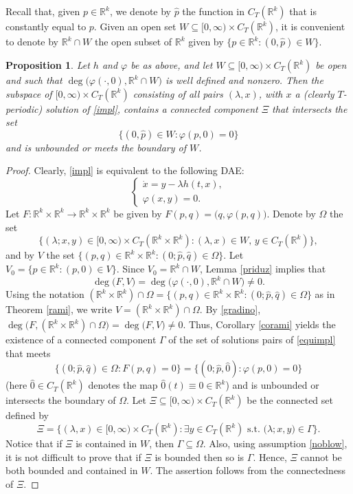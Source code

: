 \documentclass[a4paper]{amsart}
\numberwithin{equation}{section}
\newtheorem{proposition}[theorem]{Proposition}
\newcommand{\R}{\mathbb{R}}
\begin{document}
Recall that, given $p\in\R^k$, we denote by $\hat p$ the function in $C_T(\R^k)$ that is 
constantly equal to $p$. Given an open set $W\subseteq [0,\infty)\times C_T(\R^k)$, it is 
convenient to denote by $\R^k\cap W$ the open subset of $\R^k$ given by $\big\{ p\in\R^k: 
(0,\hat p)\in W\big\}$.


\begin{proposition}
Let $h$ and $\varphi$ be as above, and let $W\subseteq [0,\infty)\times C_T(\R^k)$ be 
open and such that  $\deg\big(\varphi(\cdot,0),\R^k\cap W\big)$ is well defined and nonzero. 
Then the subspace of $[0,\infty)\times C_T(\R^k)$ consisting of all pairs $(\lambda,x)$, 
with $x$ a (clearly $T$-periodic) solution of \eqref{impl}, contains a connected component 
$\Xi$ that intersects the set
\[
\big\{(0,\hat p)\in W:\varphi(p,0)=0\big\}
\]
and is unbounded or meets the boundary of $W$. 
\end{proposition}

\begin{proof}
Clearly, \eqref{impl} is equivalent to the following DAE:
\begin{equation}\label{equimpl}
\left\{
\begin{array}{l}
\dot x = y-\lambda h(t,x),\\
\varphi(x,y)=0.
\end{array}\right.
\end{equation}
Let $F:\R^k\times\R^k\to\R^k\times\R^k$ be given by $F(p,q)=\big(q,\varphi(p,q)\big)$.
Denote by $\Omega$ the set 
\[
\big\{(\lambda; x,y)\in[0,\infty)\times C_T(\R^k\times\R^k)
                                   :(\lambda,x)\in W,\,y\in C_T(\R^k)\big\},
\]
and by $V$ the set $\{(p,q)\in\R^k\times\R^k:(0;\hat p,\hat q)\in\Omega\}$. Let
$V_0=\{p\in\R^k:(p,0)\in V\}$. Since $V_0=\R^k\cap W$, Lemma \ref{priduz} implies that
\begin{equation}\label{gradino}
 \deg\big(F,V\big)=\deg\big(\varphi(\cdot,0),\R^k\cap W\big)\neq 0.
\end{equation}
Using the notation $(\R^k\times\R^k)\cap\Omega=\{(p,q)\in\R^k\times\R^k:(0;\hat p,\hat 
q)\in\Omega\}$ as in Theorem \ref{rami}, we write $V=(\R^k\times\R^k)\cap\Omega$.
By \eqref{gradino}, $\deg\big(F,(\R^k\times\R^k)\cap\Omega\big)=\deg\big(F,V\big)\neq 0$.
Thus, Corollary \ref{corami} yields the existence of a connected component $\Gamma$ of the set 
of solutions pairs of \eqref{equimpl} that meets 
\[
\{(0;\hat p,\hat q)\in\Omega:F(p,q)=0\}=\{(0;\hat p,\hat 0):\varphi(p,0)=0\}
\]
(here $\hat 0\in C_T(\R^k)$ denotes the map $\hat 0(t)\equiv 0\in\R^k$) and is unbounded 
or intersects the boundary of $\Omega$. Let $\Xi\subseteq [0,\infty)\times C_T(\R^k)$ be 
the connected set defined by
\[
\Xi=\Big\{ (\lambda,x)\in[0,\infty)\times C_T(\R^k): \exists y\in C_T(\R^k)\text{ s.t.\ } 
               \big(\lambda;x, y\big)\in\Gamma\Big\}.
\]
Notice that if $\Xi$ is contained in $W$, then $\Gamma\subseteq\Omega$. Also, using  
assumption \eqref{noblow}, it is not difficult to prove that if $\Xi$ is bounded 
then so is $\Gamma$. Hence, $\Xi$ cannot be both bounded and contained in $W$. The 
assertion follows from the connectedness of $\Xi$.
\end{proof}
\end{document}
